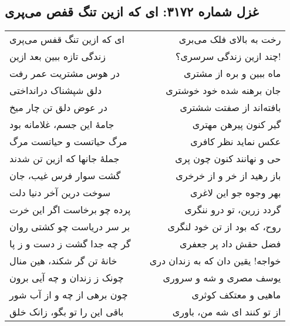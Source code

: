 \begin{center}
\section*{غزل شماره ۳۱۷۲: ای که ازین تنگ قفص می‌پری}
\label{sec:3172}
\begin{longtable}{l p{0.5cm} r}
ای که ازین تنگ قفس می‌پری
&&
رخت به بالای فلک می‌بری
\\
زندگی تازه ببین بعد ازین
&&
چند ازین زندگی سرسری؟!
\\
در هوس مشتریت عمر رفت
&&
ماه ببین و بره از مشتری
\\
دلق شپشناک درانداختی
&&
جان برهنه شده خود خوشتری
\\
در عوض دلق تن چار میخ
&&
بافته‌اند از صفتت ششتری
\\
جامهٔ این جسم، غلامانه بود
&&
گیر کنون پیرهن مهتری
\\
مرگ حیاتست و حیاتست مرگ
&&
عکس نماید نظر کافری
\\
جملهٔ جانها که ازین تن شدند
&&
حی و نهانند کنون چون پری
\\
گشت سوار فرس غیب، جان
&&
باز رهید از خر و از خرخری
\\
سوخت درین آخر دنیا دلت
&&
بهر وجوه جو این لاغری
\\
پرده چو برخاست اگر این خرت
&&
گردد زرین، تو درو ننگری
\\
بر سر دریاست چو کشتی روان
&&
روح، که بود از تن خود لنگری
\\
گر چه جدا گشت ز دست و ز پا
&&
فضل حقش داد پر جعفری
\\
خانهٔ تن گر شکند، هین منال
&&
خواجه! یقین دان که به زندان دری
\\
چونک ز زندان و چه آیی برون
&&
یوسف مصری و شه و سروری
\\
چون برهی از چه و از آب شور
&&
ماهیی و معتکف کوثری
\\
باقی این را تو بگو، زانک خلق
&&
از تو کنند ای شه من، باوری
\\
\end{longtable}
\end{center}
